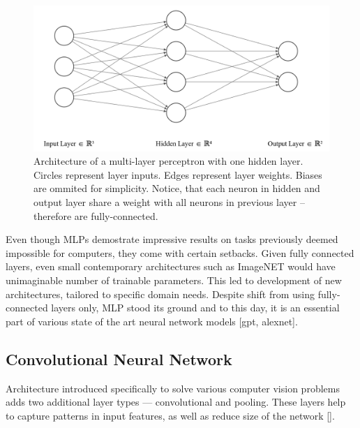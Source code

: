 
\begin{figure}[!h]
    \begin{center}
    \begin{minipage}{.75\textwidth}
      \includegraphics[width=\textwidth]{img/nn.png}
    \end{minipage}
    \caption{Architecture of a multi-layer perceptron with one hidden layer. Circles represent layer inputs. Edges represent layer weights. Biases are ommited for simplicity. Notice, that each neuron in hidden and output layer share a weight with all neurons in previous layer -- therefore are fully-connected.}
    \label{fig:simple-mlp}
    \end{center}
\end{figure}

Even though MLPs demostrate impressive results on tasks previously deemed impossible for computers, they come with certain setbacks. Given fully connected layers, even small contemporary architectures such as ImageNET would have unimaginable number of trainable parameters. This led to development of new architectures, tailored to specific domain needs. Despite shift from using fully-connected layers only, MLP stood its ground and to this day, it is an essential part of various state of the art neural network models [gpt, alexnet].

\subsection*{Convolutional Neural Network}
Architecture introduced specifically to solve various computer vision problems adds two additional layer types --- convolutional and pooling. These layers help to capture patterns in input features, as well as reduce size of the network []. 

